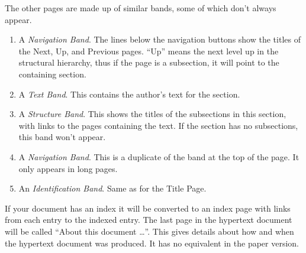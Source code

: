 \documentclass[twoside,11pt]{article}
\renewcommand{\_}{\texttt{\symbol{95}}}
\begin{document}
The other pages are made up of similar bands, some of which don't always
appear.

\begin{enumerate}
\item A \emph{Navigation Band}.
The lines below the navigation buttons show the titles of the Next, Up, and
Previous pages.
``Up'' means the next level up in the structural hierarchy, thus if the page is
a subsection, it will point to the containing section.
\item A \emph{Text Band}.
This contains the author's text for the section.
\item A \emph{Structure Band}.
This shows the titles of the subsections in this section, with links to the
pages containing the text.
If the section has no subsections, this band won't appear.
\item A \emph{Navigation Band}.
This is a duplicate of the band at the top of the page.
It only appears in long pages.
\item An \emph{Identification Band}.
 Same as for the Title Page.
\end{enumerate}

If your document has an index it will be converted to an index page with
links from each entry to the indexed entry.
The last page in the hypertext document will be called ``About this
document \ldots''.
This gives details about how and when the hypertext document was produced.
It has no equivalent in the paper version.
\end{document}
